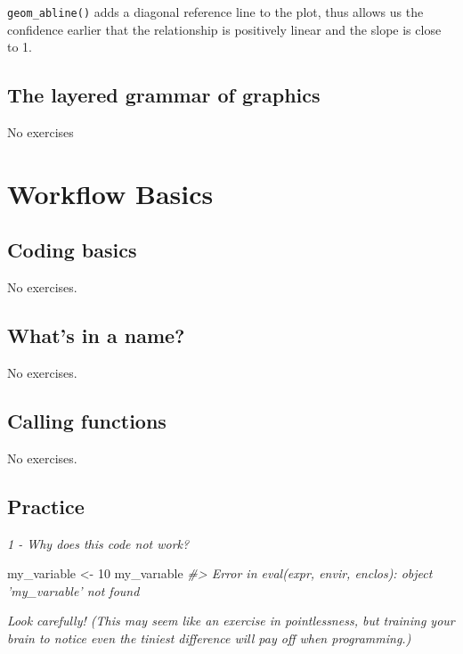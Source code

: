 \documentclass[]{article}
\newenvironment{Shaded}{\begin{snugshade}}{\end{snugshade}}
\newcommand{\DecValTok}[1]{\textcolor[rgb]{0.00,0.00,0.81}{#1}}
\newcommand{\StringTok}[1]{\textcolor[rgb]{0.31,0.60,0.02}{#1}}
\newcommand{\CommentTok}[1]{\textcolor[rgb]{0.56,0.35,0.01}{\textit{#1}}}
\newcommand{\NormalTok}[1]{#1}
\theoremstyle{definition}
\theoremstyle{definition}
\theoremstyle{definition}
\theoremstyle{remark}
\begin{document}
\texttt{geom\_abline()} adds a diagonal reference line to the plot, thus
allows us the confidence earlier that the relationship is positively
linear and the slope is close to 1.

\subsection{The layered grammar of
graphics}\label{the-layered-grammar-of-graphics}

No exercises

\section{Workflow Basics}\label{workflow-basics}

\subsection{Coding basics}\label{coding-basics}

No exercises.

\subsection{What's in a name?}\label{whats-in-a-name}

No exercises.

\subsection{Calling functions}\label{calling-functions}

No exercises.

\subsection{Practice}\label{practice}

\emph{1 - Why does this code not work?}

\begin{Shaded}
\begin{Highlighting}[]
\NormalTok{my_variable <-}\StringTok{ }\DecValTok{10}
\NormalTok{my_varıable}
\CommentTok{#> Error in eval(expr, envir, enclos): object 'my_varıable' not found}
\end{Highlighting}
\end{Shaded}

\emph{Look carefully! (This may seem like an exercise in pointlessness,
but training your brain to notice even the tiniest difference will pay
off when programming.)}
\end{document}
